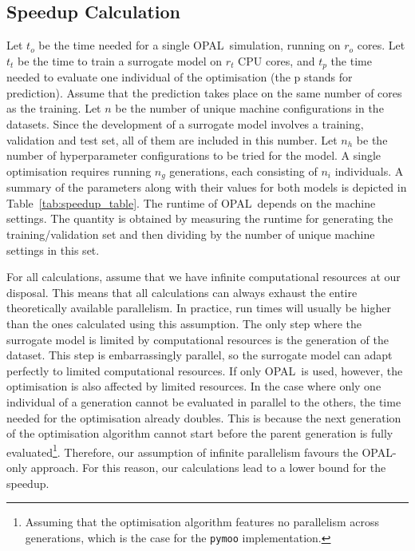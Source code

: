\documentclass[a4paper, 12pt, version-1-compatibility]{article}
\def\opal{OPAL}
\newcommand{\tabref}[1]{Table~\ref{#1}}
\begin{document}
\subsection*{Speedup Calculation}
Let $t_o$ be the time needed for a single \opal\ simulation, running on $r_o$ cores. Let $t_t$ be the time to train a surrogate model on $r_t$ CPU cores, and $t_p$ the time needed to evaluate one individual of the optimisation (the p stands for prediction). Assume that the prediction takes place on the same number of cores as the training. Let $n$ be the number of unique machine configurations in the datasets. Since the development of a surrogate model involves a training, validation and test set, all of them are included in this number. Let $n_h$ be the number of hyperparameter configurations to be tried for the model. A single optimisation requires running $n_g$ generations, each consisting of $n_i$ individuals. A summary of the parameters along with their values for both models is depicted in \tabref{tab:speedup_table}. The runtime of \opal\ depends on the machine settings. The quantity is obtained by measuring the runtime for generating the training/validation set and then dividing by the number of unique machine settings in this set.

For all calculations, assume that we have infinite computational resources at our disposal. This means that all calculations can always exhaust the entire theoretically available parallelism. In practice, run times will usually be higher than the ones calculated using this assumption. The only step where the surrogate model is limited by computational resources is the generation of the dataset. This step is embarrassingly parallel, so the surrogate model can adapt perfectly to limited computational resources. If only \opal\ is used, however, the optimisation is also affected by limited resources. In the case where only one individual of a generation cannot be evaluated in parallel to the others, the time needed for the optimisation already doubles. This is because the next generation of the optimisation algorithm cannot start before the parent generation is fully evaluated\footnote{Assuming that the optimisation algorithm features no parallelism across generations, which is the case for the \texttt{pymoo} implementation.}. Therefore, our assumption of infinite parallelism favours the \opal-only approach. For this reason, our calculations lead to a lower bound for the speedup.
\end{document}
